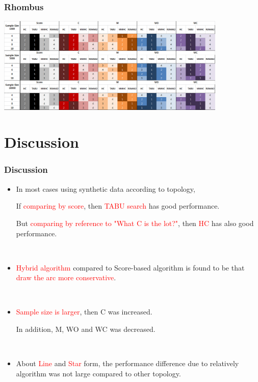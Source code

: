 \documentclass{beamer}
\begin{document}
\begin{frame}
\frametitle{Rhombus}
{\scriptsize{}
	\begin{center}
		\includegraphics[height=130pt]{images/Result_Rhombus}
	\end{center}
}
\end{frame}



\section{Discussion}
\begin{frame}
\frametitle{Discussion}
{\scriptsize{}
	\begin{itemize}
	\item In most cases using synthetic data according to topology,
	
	If \textcolor{red}{comparing by score}, then \textcolor{red}{TABU search} has good performance.
	
	But \textcolor{red}{comparing by reference to "What C is the lot?"}, then \textcolor{red}{HC} has also good performance.
	
	{}\	
	
	\item \textcolor{red}{Hybrid algorithm} compared to Score-based algorithm is found to be that \textcolor{red}{draw the arc more conservative}.

	{}\
	
	\item  \textcolor{red}{Sample size is larger}, then C was increased.
	
	In addition, M, WO and WC was decreased.
	
	{}\

	\item About  \textcolor{red}{Line} and  \textcolor{red}{Star} form, the performance difference due to relatively algorithm was not large compared to other topology.
	\end{itemize}
}
\end{frame}
\end{document}
